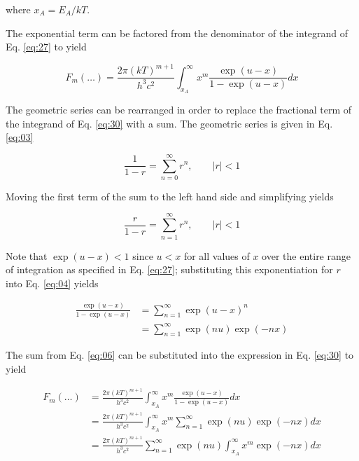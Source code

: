 \documentclass[letterpaper,12pt]{article}
\begin{document}
\noindent where $x_{A} = E_{A}/kT$.

The exponential term can be factored from the denominator of the integrand of Eq. \ref{eq:27} to yield

\begin{equation} \label{eq:30}
F_{m}(\ldots) = \frac{2 \pi (kT)^{m+1}}{h^{3}c^{2}} \int_{x_{A}}^{\infty} x^{m} \frac{\exp(u-x)}{1 - \exp(u-x)} dx
\end{equation}


The geometric series can be rearranged in order to replace the fractional term of the integrand of Eq. \ref{eq:30} with a sum. The geometric series is given in Eq. \ref{eq:03}

\begin{equation} \label{eq:03}
\frac{1}{1-r} = \sum_{n = 0}^{\infty} r^{n}, \qquad |r| < 1
\end{equation}

\noindent Moving the first term of the sum to the left hand side and simplifying yields

\begin{equation} \label{eq:04}
\frac{r}{1-r} = \sum_{n = 1}^{\infty} r^{n}, \qquad |r| < 1
\end{equation}


Note that $\exp(u-x) < 1$ since $u < x$ for all values of $x$ over the entire range of integration as specified in Eq. \ref{eq:27}; substituting this exponentiation for $r$ into Eq. \ref{eq:04} yields

\begin{align} \label{eq:06}
\frac{\exp(u-x)}{1 - \exp(u-x)} &= \sum_{n = 1}^{\infty} \exp(u-x)^{n} \nonumber \\
 &= \sum_{n = 1}^{\infty} \exp(nu) \exp(-nx)
\end{align}


The sum from Eq. \ref{eq:06} can be substituted into the expression in Eq. \ref{eq:30} to yield

\begin{align} \label{eq:07}
F_{m}(\ldots) &= \frac{2\pi (kT)^{m+1}}{h^{3} c^{2}} \int_{x_{A}}^{\infty} x^{m} \frac{\exp(u-x)}{1 - \exp(u-x)} dx \nonumber \\
 &= \frac{2\pi (kT)^{m+1}}{h^{3} c^{2}} \int_{x_{A}}^{\infty} x^{m} \sum_{n = 1}^{\infty} \exp(nu) \exp(-nx) dx \nonumber \\
 &= \frac{2\pi (kT)^{m+1}}{h^{3} c^{2}} \sum_{n = 1}^{\infty} \exp(nu) \int_{x_{A}}^{\infty} x^{m} \exp(-nx) dx
\end{align}
\end{document}
